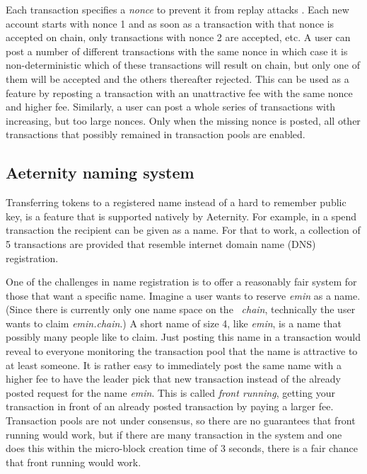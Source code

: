 Each transaction specifies a \textit{nonce}  to prevent it from replay
attacks \cite{Syverson}. Each new account starts with nonce 1 and as
soon as a transaction with that nonce is accepted on chain, only
transactions with nonce 2 are accepted, etc. A user can post a number
of different transactions with the same nonce in which case it is
non-deterministic which of these transactions will result on chain,
but only one of them will be accepted and the others thereafter
rejected. This can be used as a feature by reposting a
transaction with an unattractive fee with the same nonce and higher
fee. Similarly, a user can post a whole series of transactions with
increasing, but too large nonces. Only when the missing nonce is
posted, all other transactions that possibly remained in transaction
pools are enabled.

\subsection{Aeternity naming system}
\label{sect:aens}

Transferring tokens to a registered name instead of a hard to remember
public key, is a feature that is supported natively by Aeternity.
For example, in a spend
transaction the recipient can be given as a name. For that to work, a
collection of 5 transactions are provided that
resemble internet domain name (DNS) registration.

One of the challenges in name registration is to offer a reasonably
fair system for those that want a specific name. Imagine a user wants
to reserve \textit{emin} as a name. (Since there is currently only one
name space on the \blockchain\ \textit{chain}, technically the
user wants to claim \textit{emin.chain}.)
A short name of size 4, like \textit{emin}, is a name that
possibly many people like to claim. Just posting this name in a
transaction would reveal to everyone monitoring the
transaction pool that the name is attractive to at least someone. It
is rather easy to
immediately post the same name with a higher fee to have the leader
pick that new transaction instead of the already posted request for
the name \textit{emin}. This is called \textit{front running}, getting
your transaction in front of an already posted transaction by paying a
larger fee. Transaction pools are not under consensus, so there are no
guarantees that front running would work, but if there are many
transaction in the system and one does this within the micro-block
creation time of 3 seconds, there is a fair chance that front running
would work.

